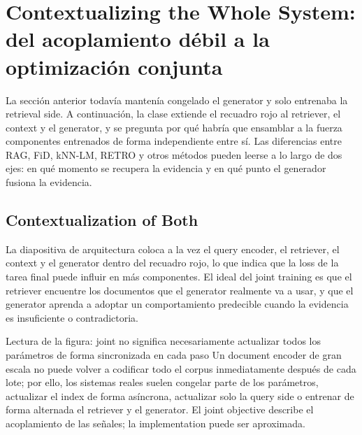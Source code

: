 \section{Contextualizing the Whole System: del acoplamiento débil a la optimización conjunta}

La sección anterior todavía mantenía congelado el generator y solo entrenaba la retrieval side. A continuación, la clase extiende el recuadro rojo al retriever, el context y el generator, y se pregunta por qué habría que ensamblar a la fuerza componentes entrenados de forma independiente entre sí. Las diferencias entre RAG, FiD, kNN-LM, RETRO y otros métodos pueden leerse a lo largo de dos ejes: en qué momento se recupera la evidencia y en qué punto el generador fusiona la evidencia.

\subsection{Contextualization of Both}

La diapositiva de arquitectura coloca a la vez el query encoder, el retriever, el context y el generator dentro del recuadro rojo, lo que indica que la loss de la tarea final puede influir en más componentes. El ideal del joint training es que el retriever encuentre los documentos que el generator realmente va a usar, y que el generator aprenda a adoptar un comportamiento predecible cuando la evidencia es insuficiente o contradictoria.


\begin{knowledgebox}{Lectura de la figura: joint no significa necesariamente actualizar todos los parámetros de forma sincronizada en cada paso}
Un document encoder de gran escala no puede volver a codificar todo el corpus inmediatamente después de cada lote; por ello, los sistemas reales suelen congelar parte de los parámetros, actualizar el index de forma asíncrona, actualizar solo la query side o entrenar de forma alternada el retriever y el generator. El joint objective describe el acoplamiento de las señales; la implementation puede ser aproximada.
\end{knowledgebox}



